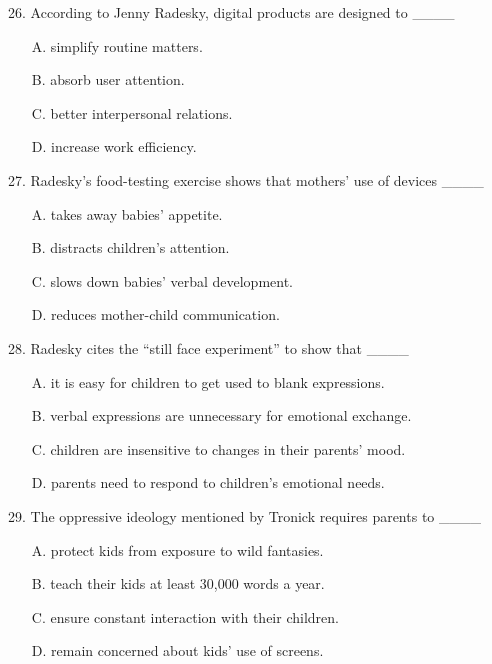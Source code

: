 \documentclass[UTF8,11pt]{ctexart}
\begin{document}
26. According to Jenny Radesky, digital products are designed to \_\_\_\_


\begin{itemize}[leftmargin=2em,itemsep=.2em,topsep=.4em]\item[A.] simplify routine matters.
\item[B.] absorb user attention.
\item[C.] better interpersonal relations.
\item[D.] increase work efficiency.
\end{itemize}

27. Radesky’s food-testing exercise shows that mothers’ use of devices \_\_\_\_


\begin{itemize}[leftmargin=2em,itemsep=.2em,topsep=.4em]\item[A.] takes away babies’ appetite.
\item[B.] distracts children’s attention.
\item[C.] slows down babies’ verbal development.
\item[D.] reduces mother-child communication.
\end{itemize}

28. Radesky cites the “still face experiment” to show that \_\_\_\_


\begin{itemize}[leftmargin=2em,itemsep=.2em,topsep=.4em]\item[A.] it is easy for children to get used to blank expressions.
\item[B.] verbal expressions are unnecessary for emotional exchange.
\item[C.] children are insensitive to changes in their parents’ mood.
\item[D.] parents need to respond to children’s emotional needs.
\end{itemize}

29. The oppressive ideology mentioned by Tronick requires parents to \_\_\_\_


\begin{itemize}[leftmargin=2em,itemsep=.2em,topsep=.4em]\item[A.] protect kids from exposure to wild fantasies.
\item[B.] teach their kids at least 30,000 words a year.
\item[C.] ensure constant interaction with their children.
\item[D.] remain concerned about kids’ use of screens.
\end{itemize}
\end{document}
